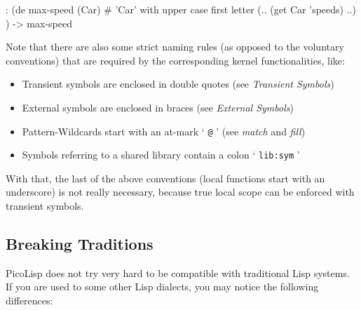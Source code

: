 \begin{wideverbatim}
: (de max-speed (Car)            # 'Car' with upper case first letter
   (.. (get Car 'speeds) ..) )
-> max-speed
\end{wideverbatim}

Note that there are also some strict naming rules (as opposed to the
voluntary conventions) that are required by the corresponding kernel
functionalities, like:

\begin{itemize}
\item Transient symbols are enclosed in double quotes (see
   \emph{Transient Symbols})
\item External symbols are enclosed in braces (see \emph{External Symbols})
\item Pattern-Wildcards start with an at-mark ` \texttt{@} ' (see
   \emph{match} and \emph{fill})
\item Symbols referring to a shared library contain a colon ` \texttt{lib:sym} '
\end{itemize}

With that, the last of the above conventions (local functions start with
an underscore) is not really necessary, because true local scope can be
enforced with transient symbols.

 
\subsection{Breaking Traditions}
\label{sec:refm-breaking-traditions}


PicoLisp does not try very hard to be compatible with traditional Lisp
systems. If you are used to some other Lisp dialects, you may notice the
following differences:

